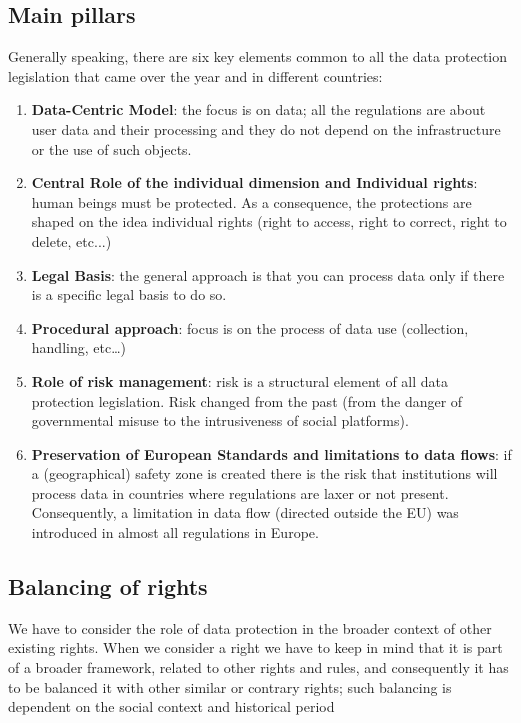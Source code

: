 \subsection{Main pillars}
Generally speaking, there are six key elements common to all the data protection legislation that came over the year and in different countries:
\begin{enumerate}
    \item \textbf{Data-Centric Model}: the focus is on data; all the regulations are about user data and their processing and they do not depend on the infrastructure or the use of such objects.
    \item \textbf{Central Role of the individual dimension and Individual rights}: human beings must be protected. As a consequence, the protections are shaped on the idea individual rights (right to access, right to correct, right to delete, etc...)
    \item \textbf{Legal Basis}: the general approach is that you can process data only if there is a specific legal basis to do so.
    \item \textbf{Procedural approach}: focus is on the process of data use (collection, handling, etc…)
    \item \textbf{Role of risk management}: risk is a structural element of all data protection legislation. Risk changed from the past (from the danger of governmental misuse to the intrusiveness of social platforms).
    \item  \textbf{Preservation of European Standards and limitations to data flows}: if a (geographical) safety zone is created there is the risk that institutions will process data in countries where regulations are laxer or not present. Consequently, a limitation in data flow (directed outside the EU) was introduced in almost all regulations in Europe.
\end{enumerate}
\subsection{Balancing of rights}
We have to consider the role of data protection in the broader context of other existing
rights. When we consider a right we have to keep in mind that it is part of a broader
framework, related to other rights and rules, and consequently it has to be balanced it with
other similar or contrary rights; such balancing is dependent on the social context and
historical period
